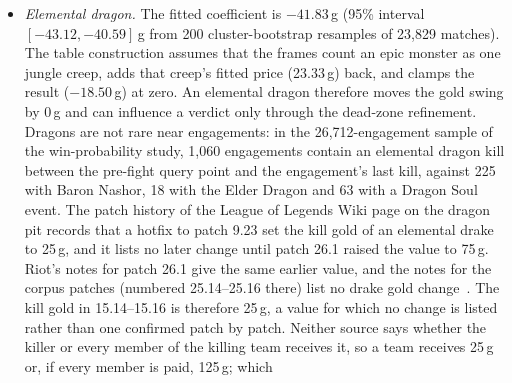 \begin{itemize}
\item \emph{Elemental dragon.} The fitted coefficient is $-41.83$\,g (95\% interval
  $[-43.12, -40.59]$\,g from 200 cluster-bootstrap resamples of 23,829 matches). The table
  construction assumes that the frames count an epic monster as one jungle creep, adds that creep's
  fitted price (23.33\,g) back, and clamps the result ($-18.50$\,g) at zero. An elemental dragon
  therefore moves the gold swing by 0\,g and can influence a verdict only through the dead-zone
  refinement.
  Dragons are not rare near engagements: in the 26,712-engagement sample of the win-probability
  study, 1,060 engagements contain an elemental dragon kill between the pre-fight query point and
  the engagement's last kill, against 225 with Baron Nashor, 18 with the Elder Dragon and 63 with a
  Dragon Soul event.
  The patch history of the League of Legends Wiki page on the dragon pit records that a hotfix to
  patch 9.23 set the kill gold of an elemental drake to 25\,g, and it lists no later change until
  patch 26.1 raised the value to 75\,g. Riot's notes for patch 26.1 give the same earlier value, and the notes for the
  corpus patches (numbered 25.14--25.16 there) list no drake gold
  change~\cite{lolwiki2026dragonpit,riot2026patch261,riot2025patch2514,riot2025patch2515,riot2025patch2516}.
  The kill gold in 15.14--15.16 is therefore 25\,g, a value for which no change is listed rather than
  one confirmed patch by patch. Neither source says whether the killer or every member of the
  killing team receives it, so a team receives 25\,g or, if every member is paid, 125\,g; which

\end{itemize}
